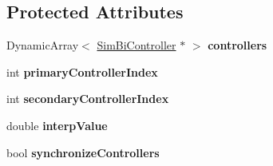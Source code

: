\subsection*{Protected Attributes}
\begin{DoxyCompactItemize}
\item 
\hypertarget{classCartWheel_1_1Core_1_1CompositeController_ae5a10f8dd216b3054b1fe24ef6852544}{
DynamicArray$<$ \hyperlink{classCartWheel_1_1Core_1_1SimBiController}{SimBiController} $\ast$ $>$ {\bfseries controllers}}
\label{classCartWheel_1_1Core_1_1CompositeController_ae5a10f8dd216b3054b1fe24ef6852544}

\item 
\hypertarget{classCartWheel_1_1Core_1_1CompositeController_a2f094b4e7277314484c783b262f2a97d}{
int {\bfseries primaryControllerIndex}}
\label{classCartWheel_1_1Core_1_1CompositeController_a2f094b4e7277314484c783b262f2a97d}

\item 
\hypertarget{classCartWheel_1_1Core_1_1CompositeController_a06a6b36e0b81101f5a17feccd6a78d36}{
int {\bfseries secondaryControllerIndex}}
\label{classCartWheel_1_1Core_1_1CompositeController_a06a6b36e0b81101f5a17feccd6a78d36}

\item 
\hypertarget{classCartWheel_1_1Core_1_1CompositeController_a00804cfae56960bd56b752a52961613d}{
double {\bfseries interpValue}}
\label{classCartWheel_1_1Core_1_1CompositeController_a00804cfae56960bd56b752a52961613d}

\item 
\hypertarget{classCartWheel_1_1Core_1_1CompositeController_a51e4bd17b45806e8c22adf5df42534d4}{
bool {\bfseries synchronizeControllers}}
\label{classCartWheel_1_1Core_1_1CompositeController_a51e4bd17b45806e8c22adf5df42534d4}

\end{DoxyCompactItemize}
